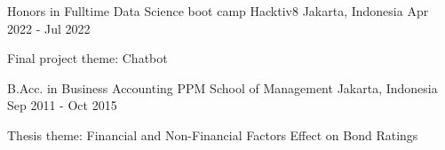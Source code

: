 

\begin{cventries}

  \cventry
    {Honors in Fulltime Data Science boot camp} %
    {Hacktiv8} %
    {Jakarta, Indonesia} %
    {Apr 2022 - Jul 2022} %
    {
      \begin{cvitems} %
        \item {Final project theme: Chatbot}
      \end{cvitems}
    }

  \cventry
    {B.Acc. in Business Accounting} %
    {PPM School of Management} %
    {Jakarta, Indonesia} %
    {Sep 2011 - Oct 2015} %
    {
      \begin{cvitems} %
        \item {Thesis theme: Financial and Non-Financial Factors Effect on Bond Ratings}
      \end{cvitems}
    }

\end{cventries}
